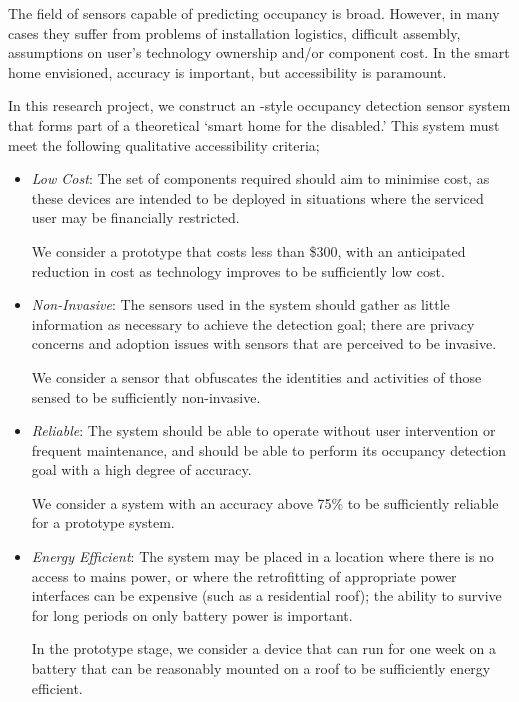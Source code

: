 \documentclass[../thesis/thesis.tex]{subfiles}
\begin{document}
The field of sensors capable of predicting occupancy is broad. However, in many cases they suffer from problems of installation logistics, difficult assembly, assumptions on user's technology ownership and/or component cost. In the smart home envisioned, accuracy is important, but accessibility is paramount.

In this research project, we construct an \iot-style occupancy detection sensor system that forms part of a theoretical `smart home for the disabled.' This system must meet the following qualitative accessibility criteria;

\begin{itemize}
 \item \emph{Low Cost}: The set of components required should aim to minimise cost, as these devices are intended to be deployed in situations where the serviced user may be financially restricted. 

 We consider a prototype that costs less than \$300, with an anticipated reduction in cost as technology improves to be sufficiently low cost.
  
 \item \emph{Non-Invasive}: The sensors used in the system should gather as little information as necessary to achieve the detection goal; there are privacy concerns and adoption issues with sensors that are perceived to be invasive.

 We consider a sensor that obfuscates the identities and activities of those sensed to be sufficiently non-invasive.
 
 \item \emph{Reliable}: The system should be able to operate without user intervention or frequent maintenance, and should be able to perform its occupancy detection goal with a high degree of accuracy.

 We consider a system with an accuracy above 75\% to be sufficiently reliable for a prototype system.
 
 \item \emph{Energy Efficient}: The system may be placed in a location where there is no access to mains power, or where the retrofitting of appropriate power interfaces can be expensive (such as a residential roof); the ability to survive for long periods on only battery power is important.

 In the prototype stage, we consider a device that can run for one week on a battery that can be reasonably mounted on a roof to be sufficiently energy efficient.
\end{itemize}
\end{document}

